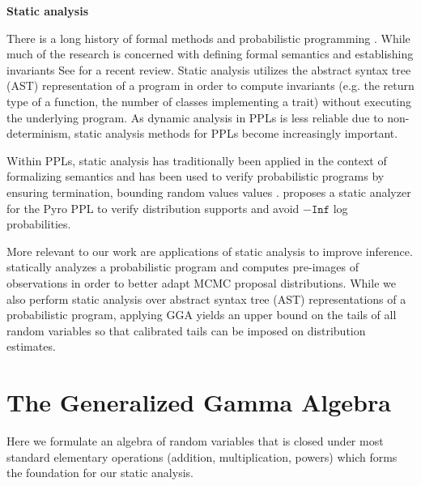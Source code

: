 \documentclass[../thesis.tex]{subfiles}
\begin{document}
\textbf{Static analysis}

There is a long history of formal methods and probabilistic programming
\cite{kozen1979semantics,jones1989probabilistic}. While much of the research
\cite{claret2013bayesian}
is concerned with defining formal semantics
and establishing invariants \cite{wang2018pmaf}
See \cite{bernstein2019static} for a recent review.
Static analysis utilizes the abstract syntax tree (AST)
representation of a program in order to compute invariants
(e.g. the return type of a function, the number of classes implementing a trait)
without executing the underlying program.
As dynamic analysis in PPLs is less reliable due to non-determinism, static analysis
methods for PPLs become increasingly important.

Within PPLs, static analysis has traditionally been applied in the context of formalizing
semantics \citep{kozen1979semantics} and has been used to verify probabilistic
programs by ensuring termination, bounding random values values
\citep{sankaranarayanan2013static}. \cite{lee2019towards} proposes a static analyzer for the
Pyro PPL \citep{bingham2019pyro} to verify
distribution supports and avoid $-\texttt{Inf}$ log probabilities.


More relevant to our work are applications of static analysis to improve inference. \citet{nori2014r2} statically analyzes a probabilistic program and computes pre-images of observations in order to better adapt MCMC proposal distributions.
While we also perform static analysis over
abstract syntax tree (AST) representations of a probabilistic program,
applying GGA yields an upper bound on the tails of all random variables
so that calibrated tails can be imposed on distribution estimates.

\section{The Generalized Gamma Algebra}\label{sec:gga}

Here we formulate an algebra of random variables that is closed under most standard elementary operations (addition, multiplication, powers) which forms the foundation for our static analysis.
\end{document}
